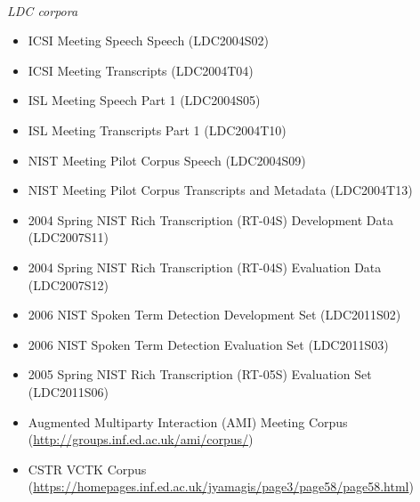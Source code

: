 \documentclass{article}
\begin{document}
\begin{appendices}
\vspace{0.5cm}
 \\
{\it LDC corpora}
\begin{itemize}
    \item ICSI Meeting Speech Speech (LDC2004S02)
    \item ICSI Meeting Transcripts (LDC2004T04)
    \item ISL Meeting Speech Part 1 (LDC2004S05)
    \item ISL Meeting Transcripts Part 1 (LDC2004T10)
    \item NIST Meeting Pilot Corpus Speech (LDC2004S09)
    \item NIST Meeting Pilot Corpus Transcripts and Metadata (LDC2004T13)
    \item 2004 Spring NIST Rich Transcription (RT-04S) Development Data (LDC2007S11)
    \item 2004 Spring NIST Rich Transcription (RT-04S) Evaluation Data (LDC2007S12)
    \item 2006 NIST Spoken Term Detection Development Set (LDC2011S02)
    \item 2006 NIST Spoken Term Detection Evaluation Set (LDC2011S03)
    \item 2005 Spring NIST Rich Transcription (RT-05S) Evaluation Set (LDC2011S06)
\end{itemize}

\vspace{0.25cm}
\begin{itemize}
    \item Augmented Multiparty Interaction (AMI) Meeting Corpus (\url{http://groups.inf.ed.ac.uk/ami/corpus/})
    \item CSTR VCTK Corpus (\url{https://homepages.inf.ed.ac.uk/jyamagis/page3/page58/page58.html})
\end{itemize}




\end{appendices}
\end{document}
